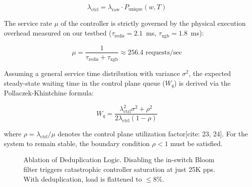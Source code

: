 \documentclass[sigconf, nonacm]{acmart}
\begin{document}
\begin{equation}
\lambda_{\text{ctrl}} = \lambda_{\text{raw}} \cdot P_{\text{unique}}(w, T)
\end{equation}

The service rate $\mu$ of the controller is strictly governed by the physical execution overhead measured on our testbed ($\tau_{\text{redis}} = 2.1$~ms, $\tau_{\text{xgb}} = 1.8$~ms):

\begin{equation}
\mu = \frac{1}{\tau_{\text{redis}} + \tau_{\text{xgb}}} \approx 256.4 \text{ requests/sec}
\end{equation}

Assuming a general service time distribution with variance $\sigma^2$, the expected steady-state waiting time in the control plane queue ($W_q$) is derived via the Pollaczek-Khintchine formula:

\begin{equation}
W_q = \frac{\lambda_{\text{ctrl}}^2 \sigma^2 + \rho^2}{2\lambda_{\text{ctrl}}(1 - \rho)}
\end{equation}

\noindent where $\rho = \lambda_{\text{ctrl}} / \mu$ denotes the control plane utilization factor[cite: 23, 24]. For the system to remain stable, the boundary condition $\rho < 1$ must be satisfied. 

\begin{figure}[h]
\centering
{}
\caption{Ablation of Deduplication Logic. Disabling the in-switch Bloom filter triggers catastrophic controller saturation at just 25K pps. With deduplication, load is flattened to $\le 8$\%.}
\label{fig:ablation_dedup}
\end{figure}
\end{document}
